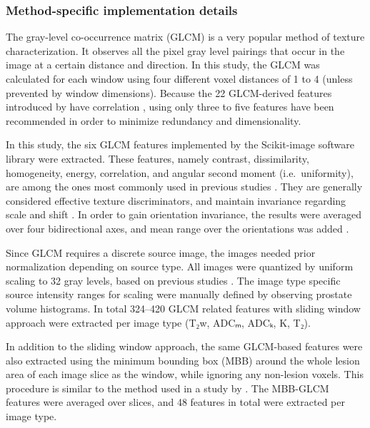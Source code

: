 \subsubsection{Method-specific implementation details}

The gray-level co-occurrence matrix (GLCM) \citep{Haralick1973} is a very
popular method of texture characterization. It observes all the pixel gray level
pairings that occur in the image at a certain distance and direction. In this
study, the GLCM was calculated for each window using four different voxel
distances of 1 to 4 (unless prevented by window dimensions). Because the 22
GLCM-derived features introduced by \citet{Haralick1973} have correlation
\citep{Albregtsen2008}, using only three to five features have been recommended
\citep{Clausi2002Analysis, Albregtsen2008, Gebejes2013a} in order to minimize
redundancy and dimensionality.

In this study, the six GLCM features implemented by the Scikit-image software
library \citep{VanderWalt2014} were extracted. These features, namely contrast,
dissimilarity, homogeneity, energy, correlation, and angular second moment
(i.e.\ uniformity), are among the ones most commonly used in previous studies
\citep{Clausi2002Rapid}. They are generally considered effective texture
discriminators, and maintain invariance regarding scale and shift
\citep{Clausi2002Analysis}. In order to gain orientation invariance, the results
were averaged over four bidirectional axes, and mean range over the orientations
was added \citep{Haralick1973}.

Since GLCM requires a discrete source image, the images needed prior
normalization depending on source type. All images were quantized by uniform
scaling to 32 gray levels, based on previous studies \citep{Clausi2002Analysis,
Clausi2002Rapid, Albregtsen2008}. The image type specific source intensity
ranges for scaling were manually defined by observing prostate volume
histograms. In total 324--420 GLCM related features with sliding window approach
were extracted per image type (T₂w, ADCₘ, ADCₖ, K, T₂).

In addition to the sliding window approach, the same GLCM-based features were
also extracted using the minimum bounding box (MBB) around the whole lesion
area of each image slice as the window, while ignoring any non-lesion voxels.
This procedure is similar to the method used in a study by \citet{Vignati2015}.
The MBB-GLCM features were averaged over slices, and 48 features in total were
extracted per image type.

